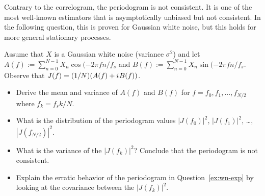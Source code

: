 \documentclass[11pt]{article}
\begin{document}
Contrary to the correlogram, the periodogram is not consistent.
It is one of the most well-known estimators that is asymptotically unbiased but not consistent.
In the following question, this is proven for Gaussian white noise, but this holds for more general stationary processes.
\begin{exercise}
    Assume that $X$ is a Gaussian white noise (variance $\sigma^2$) and let $A(f):=\sum_{n=0}^{N-1} X_n \cos(-2\pi f n/f_s$ and $B(f):=\sum_{n=0}^{N-1} X_n \sin(-2\pi f n/f_s$.
    Observe that $J(f) = (1/N) (A(f) + {i\mkern1mu} B(f))$.
    \begin{itemize}
        \item Derive the mean and variance of $A(f)$ and $B(f)$ for $f=f_0, f_1,\dots, f_{N/2}$ where $f_k=f_s k/N$.
        \item What is the distribution of the periodogram values $|J(f_0)|^2$, $|J(f_1)|^2$, \dots, $|J(f_{N/2})|^2$.
        \item What is the variance of the $|J(f_k)|^2$? Conclude that the periodogram is not consistent.
        \item Explain the erratic behavior of the periodogram in Question~\ref{ex:wn-exp} by looking at the covariance between the $|J(f_k)|^2$.
    \end{itemize}
    
\end{exercise}
\end{document}
